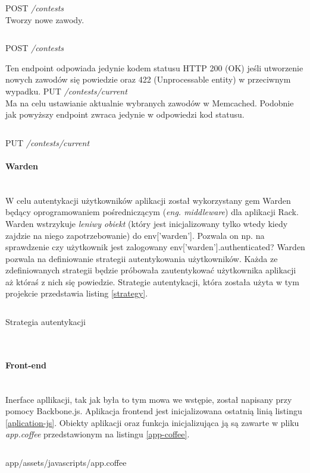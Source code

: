 \documentclass[11pt,a4paper, twoside]{article}
\begin{document}
POST \emph{/contests}
\\
\noindent
Tworzy nowe zawody.
\begin{listing}[H]
\inputminted{ruby}{./src/contest_curl}
\caption{POST \emph{/contests}}
\end{listing}
\noindent
Ten endpoint odpowiada jedynie kodem statusu HTTP 200 (OK) jeśli utworzenie nowych zawodów się powiedzie oraz 422 (Unprocessable entity) w przeciwnym wypadku.
\newline
\newline
\noindent
PUT \emph{/contests/current}
\\
\noindent
Ma na celu ustawianie aktualnie wybranych zawodów w Memcached. Podobnie jak powyższy endpoint zwraca jedynie w odpowiedzi kod statusu.
\begin{listing}[H]
\inputminted{ruby}{./src/curl_current_contest}
\caption{PUT \emph{/contests/current}}
\end{listing}
\paragraph{Warden}\label{warden} ~\\
W celu autentykacji użytkowników aplikacji został wykorzystany gem Warden będący oprogramowaniem pośredniczącym (\emph{eng. middleware}) dla aplikacji Rack. Warden wstrzykuje \emph{leniwy obiekt} (który jest inicjalizowany tylko wtedy kiedy zajdzie na niego zapotrzebowanie) do env['warden']. Pozwala on np. na sprawdzenie czy użytkownik jest zalogowany env['warden'].authenticated? Warden pozwala na definiowanie strategii autentykowania użytkowników. Każda ze zdefiniowanych strategii będzie próbowała zautentykować użytkownika aplikacji aż któraś z nich się powiedzie. Strategie autentykacji, która została użyta w tym projekcie przedstawia listing \ref{strategy}.

\begin{listing}[H]
\inputminted[linenos=true]{ruby}{./src/warden_strategy.rb}
\caption{Strategia autentykacji}
$\label{strategy}$
\end{listing}
\newpage
\paragraph{Front-end} ~\\
Inerface apllikacji, tak jak była to tym mowa we wstępie, został napisany przy pomocy Backbone.js. Aplikacja frontend jest inicjalizowana ostatnią linią listingu \ref{aplication-js}. Obiekty aplikacji oraz funkcja inicjalizująca ją są zawarte w pliku \emph{app.coffee} przedstawionym na listingu \ref{app-coffee}. 
\begin{listing}[H]
\inputminted{js}{./src/app.coffee}
\caption{app/assets/javascripts/app.coffee}
$\label{app-coffee}$
\end{listing}
\end{document}
